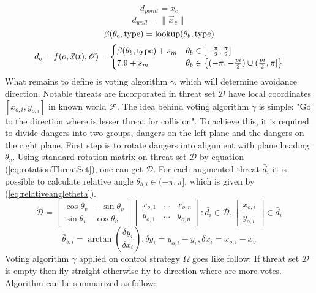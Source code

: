 \begin{equation}\label{eq:pointdistance}
    d_{point} = x_c
\end{equation}
\begin{equation}\label{eq:walldisance}
    d_{wall} = \|\vec{x}_c\|
\end{equation}
\begin{equation}\label{eq:betalookup}
    \beta(\theta_b,\textnormal{type})=\textnormal{lookup}(\theta_b,\textnormal{type})
\end{equation}
\begin{equation}\label{eq:smartdistancefunction}
d_c = f(o,\vec{x}(t),\mathscr{O}) =
    \begin{cases}  
      \beta(\theta_b,\textnormal{type}) +s_m & \theta_b\in[-\frac{\pi}{2},\frac{\pi}{2}]\\
      7.9 + s_m  & \theta_b \in \left\{(-\pi,-\frac{pi}{2})\cup(\frac{pi}{2},\pi]\right\}
   \end{cases}
\end{equation}
What remains to define is voting algorithm $\gamma$, which will determine avoidance direction. Notable threats are incorporated in threat set $\mathscr{D}$ have local coordinates $[x_{o,i},y_{o,i}]$ in known world $\mathscr{F}$. The idea behind voting algorithm $\gamma$ is simple: "Go to the direction where is lesser threat for collision". To achieve this, it is required to divide dangers into two groups, dangers on the left plane and the dangers on the right plane. First step is to rotate dangers into alignment with plane heading $\theta_v$. Using standard rotation matrix on threat set $\mathscr{D}$ by equation (\ref{eq:rotationThreatSet}), one can get $\bar{\mathscr{D}}$. For each augmented threat $\bar{d}_i$ it is possible to calculate relative angle $\bar{\theta}_{b,i}\in(-\pi,\pi]$, which is given by (\ref{eq:relativeangletheta}).
\begin{equation}\label{eq:rotationThreatSet}
    \bar{\mathscr{D}}=
    \begin{bmatrix}
    \cos\theta_v&-\sin\theta_v\\
    \sin\theta_v&\cos\theta_v
    \end{bmatrix}
    \begin{bmatrix}
    x_{o,1}&\dots&x_{o,n}\\
    y_{o,1}&\dots&y_{o,n}
    \end{bmatrix}:
    \bar{d_i}\in\bar{\mathscr{D}},
    \begin{bmatrix}
    \bar{x}_{o,i}\\
    \bar{y}_{o,i}
    \end{bmatrix}
    \in \bar{d}_i 
\end{equation}
\begin{equation}\label{eq:relativeangletheta}
    \bar{\theta}_{b,i} = \arctan\left (\frac{\delta y_i}{\delta x_i}\right):\delta y_i = \bar{y}_{o,i} - y_v, \delta x_i = \bar{x}_{o,i} - x_v
\end{equation}
Voting algorithm $\gamma$ applied on control strategy $\Omega$ goes like follow: If threat set $\mathscr{D}$ is empty then fly straight otherwise fly to direction where are more votes. Algorithm can be summarized as follow: 

